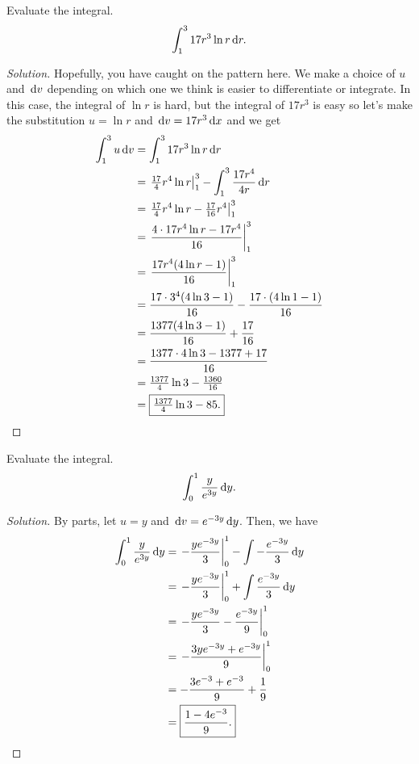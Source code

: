 \begin{problem}[WebAssign HW 9, 5]
Evaluate the integral.
\[
\int_1^3 17r^3\ln r\,\mathrm{d} r.
\]
\end{problem}
\begin{proof}[Solution]
Hopefully, you have caught on the pattern here. We make a choice of $u$ and
$\,\mathrm{d} v$ depending on which one we think is easier to differentiate or
integrate. In this case, the integral of $\ln r$ is hard, but the integral
of $17r^3$ is easy so let's make the substitution $u=\ln r$ and $\,\mathrm{d}
v=17r^3\,\mathrm{d} x$ and we get
\begin{align*}
  \int_1^3 u\,\mathrm{d} v&=\int_1^3 17r^3\ln r\,\mathrm{d} r\\
                   &=\left.\tfrac{17}{4}r^4\ln r\right|_1^3
                     -\int_1^3\frac{17r^4}{4r}\,\mathrm{d} r\\
                   &=\left.\tfrac{17}{4}r^4\ln
                     r-\tfrac{17}{16}r^4\right|_1^3\\
                   &=\left.\frac{4\cdot 17r^4\ln
                     r-17r^4}{16}\right|_1^3\\
                   &=\left.\frac{17r^4(4\ln r-1)}{16}\right|_1^3\\
                   &=\frac{17\cdot 3^4(4\ln 3-1)}{16}-\frac{17\cdot (4\ln
                     1-1)}{16}\\
                   &=\frac{1377(4\ln 3-1)}{16}+\frac{17}{16}\\
                   &=\frac{1377\cdot 4\ln 3-1377+17}{16}\\
                   &=\tfrac{1377}{4}\ln 3-\tfrac{1360}{16}\\
                   &=\boxed{\tfrac{1377}{4}\ln 3-85.}
\end{align*}
\end{proof}

\begin{problem}[WebAssign HW 9, 6]
Evaluate the integral.
\[
\int_0^1 \frac{y}{e^{3y}}\,\mathrm{d} y.
\]
\end{problem}
\begin{proof}[Solution]
By parts, let $u=y$ and $\,\mathrm{d} v=e^{-3y}\,\mathrm{d} y$. Then, we have
\begin{align*}
\int_0^1\frac{y}{e^{3y}}\,\mathrm{d} y
&=\left.-\frac{ye^{-3y}}{3}\right|_0^1-\int-\frac{e^{-3y}}{3}\,\mathrm{d} y\\
&=\left.-\frac{ye^{-3y}}{3}\right|_0^1
+\int\frac{e^{-3y}}{3}\,\mathrm{d} y\\
&=\left.-\frac{ye^{-3y}}{3}-\frac{e^{-3y}}{9}\right|_0^1\\
&=\left.-\frac{3ye^{-3y}+e^{-3y}}{9}\right|_0^1\\
&=-\frac{3e^{-3}+e^{-3}}{9}+\frac{1}{9}\\
&=\boxed{\frac{1-4e^{-3}}{9}.}
\end{align*}
\end{proof}

